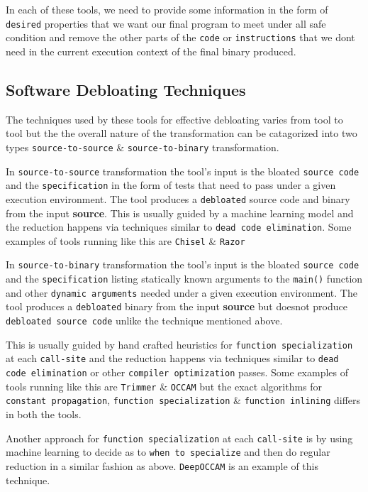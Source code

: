 \documentclass{relatorio}
\begin{document}
In each of these tools, we need to provide some information in the form of \texttt{desired} properties that we want our final program to meet under all safe condition and remove the other parts of the \texttt{code} or \texttt{instructions} that we dont need in the current execution context of the final binary produced.  

\subsection{Software Debloating Techniques}%

The techniques used by these tools for effective debloating varies from tool to tool but the the overall nature of the transformation can be catagorized into two types \texttt{source-to-source} \& \texttt{source-to-binary} transformation. 

In \texttt{source-to-source} transformation the tool's input is the bloated \texttt{source code} and the \texttt{specification} in the form of tests that need to pass under a given execution environment. The tool produces a \texttt{debloated} source code and binary from the input \textbf{source}. This is usually guided by a machine learning model and the reduction happens via techniques similar to \texttt{dead code elimination}. Some examples of tools running like this are \texttt{Chisel} \& \texttt{Razor}
 
In \texttt{source-to-binary} transformation the tool's input is the bloated \texttt{source code} and the \texttt{specification} listing statically known arguments to the \texttt{main()} function and other \texttt{dynamic arguments} needed under a given execution environment. The tool produces a \texttt{debloated} binary from the input \textbf{source} but doesnot produce \texttt{debloated source code} unlike the technique mentioned above. 

This is usually guided by hand crafted heuristics for \texttt{function specialization} at each \texttt{call-site} and the reduction happens via techniques similar to \texttt{dead code elimination} or other \texttt{compiler optimization} passes. Some examples of tools running like this are \texttt{Trimmer} \& \texttt{OCCAM} but the exact algorithms for \texttt{constant propagation}, \texttt{function specialization} \& \texttt{function inlining} differs in both the tools. 

Another approach for \texttt{function specialization} at each \texttt{call-site} is by using machine learning to decide as to \texttt{when to specialize} and then do regular reduction in a similar fashion as above. \texttt{DeepOCCAM} is an example of this technique. 
\end{document}

